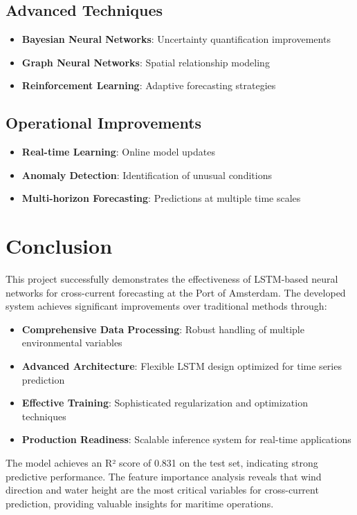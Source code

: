 \documentclass[12pt,a4paper]{article}
\begin{document}
\subsection{Advanced Techniques}
\begin{itemize}
    \item \textbf{Bayesian Neural Networks}: Uncertainty quantification improvements
    \item \textbf{Graph Neural Networks}: Spatial relationship modeling
    \item \textbf{Reinforcement Learning}: Adaptive forecasting strategies
\end{itemize}

\subsection{Operational Improvements}
\begin{itemize}
    \item \textbf{Real-time Learning}: Online model updates
    \item \textbf{Anomaly Detection}: Identification of unusual conditions
    \item \textbf{Multi-horizon Forecasting}: Predictions at multiple time scales
\end{itemize}

\section{Conclusion}

This project successfully demonstrates the effectiveness of LSTM-based neural networks for cross-current forecasting at the Port of Amsterdam. The developed system achieves significant improvements over traditional methods through:

\begin{itemize}
    \item \textbf{Comprehensive Data Processing}: Robust handling of multiple environmental variables
    \item \textbf{Advanced Architecture}: Flexible LSTM design optimized for time series prediction
    \item \textbf{Effective Training}: Sophisticated regularization and optimization techniques
    \item \textbf{Production Readiness}: Scalable inference system for real-time applications
\end{itemize}

The model achieves an R² score of 0.831 on the test set, indicating strong predictive performance. The feature importance analysis reveals that wind direction and water height are the most critical variables for cross-current prediction, providing valuable insights for maritime operations.
\end{document}
